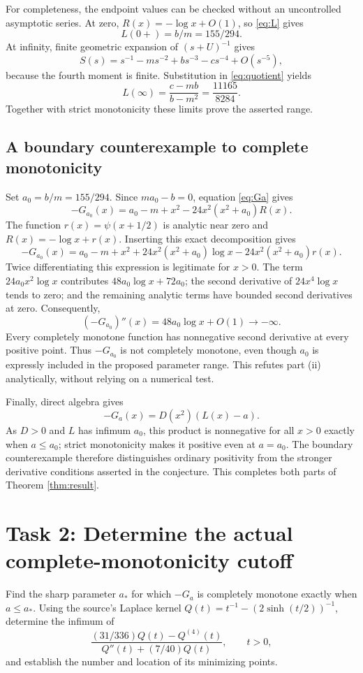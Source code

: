 \documentclass[11pt]{article}
\begin{document}
For completeness, the endpoint values can be checked without an
uncontrolled asymptotic series. At zero,
$R(x)=-\log x+O(1)$, so \eqref{eq:L} gives
\[
 L(0+)=b/m=155/294.
\]
At infinity, finite geometric expansion of $(s+U)^{-1}$ gives
\[
 S(s)=s^{-1}-ms^{-2}+bs^{-3}-cs^{-4}+O(s^{-5}),
\]
because the fourth moment is finite. Substitution in
\eqref{eq:quotient} yields
\[
 L(\infty)=\frac{c-mb}{b-m^2}=\frac{11165}{8284}.
\]
Together with strict monotonicity these limits prove the asserted range.

\subsection*{A boundary counterexample to complete monotonicity}
Set $a_0=b/m=155/294$. Since $ma_0-b=0$, equation \eqref{eq:Ga} gives
\begin{equation}\label{eq:boundary}
 -G_{a_0}(x)=a_0-m+x^2-24x^2(x^2+a_0)R(x).
\end{equation}
The function $r(x)=\psi(x+1/2)$ is analytic near zero and
$R(x)=-\log x+r(x)$. Inserting this exact decomposition gives
\[
 -G_{a_0}(x)=a_0-m+x^2
       +24x^2(x^2+a_0)\log x-24x^2(x^2+a_0)r(x).
\]
Twice differentiating this expression is legitimate for $x>0$.
The term $24a_0x^2\log x$ contributes
$48a_0\log x+72a_0$; the second derivative of $24x^4\log x$
tends to zero; and the remaining analytic terms have bounded second
derivatives at zero. Consequently,
\[
 (-G_{a_0})''(x)=48a_0\log x+O(1)\to-\infty.
\]
Every completely monotone function has nonnegative second derivative
at every positive point. Thus $-G_{a_0}$ is not completely monotone,
even though $a_0$ is expressly included in the proposed parameter range.
This refutes part (ii) analytically, without relying on a numerical test.

Finally, direct algebra gives
\[
 -G_a(x)=D(x^2)(L(x)-a).
\]
As $D>0$ and $L$ has infimum $a_0$, this product is nonnegative for all
$x>0$ exactly when $a\leq a_0$; strict monotonicity makes it positive
even at $a=a_0$. The boundary counterexample therefore distinguishes
ordinary positivity from the stronger derivative conditions asserted
in the conjecture. This completes both parts of Theorem \ref{thm:result}.

\section*{Task 2: Determine the actual complete-monotonicity cutoff}
Find the sharp parameter $a_*$ for which $-G_a$ is completely monotone
exactly when $a\leq a_*$. Using the source's Laplace kernel
$Q(t)=t^{-1}-(2\sinh(t/2))^{-1}$, determine the infimum of
\[
 \frac{(31/336)Q(t)-Q^{(4)}(t)}{Q''(t)+(7/40)Q(t)},\qquad t>0,
\]
and establish the number and location of its minimizing points.
\end{document}
